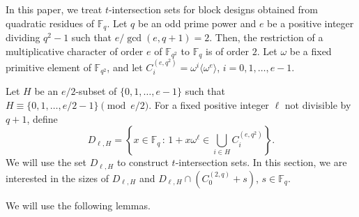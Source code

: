 \documentclass[ALCO,ThmDefs,Unicode]{cedram}
\newcommand*\F{{\mathbb F}}
\begin{document}
In this paper, we treat $t$-intersection sets for block designs obtained from quadratic residues of $\F_q$. Let $q$ be an odd prime power and $e$ be a positive integer dividing $q^2-1$ such that $e/\gcd{(e,q+1)}=2$. Then, the restriction of a multiplicative character of order $e$ of $\F_{q^2}$ to $\F_q$ is of order $2$. Let $\omega$ be a fixed primitive element of $\F_{q^2}$, and let $C_i^{(e,q^2)}=\omega^i\langle \omega^e\rangle$, $i=0,1,\ldots,e-1$.

Let $H$ be an $e/2$-subset of $\{0,1,\ldots,e-1\}$ such that $H\equiv \{0,1,\ldots,e/2-1\}\pmod{e/2}$. For a fixed positive integer $\ell$ not divisible by $q+1$, define
\begin{equation}\label{eq:defDDD}
D_{\ell,H}=\left\{x\in \F_q\,:\,1+x \omega^\ell\in \bigcup_{i \in H}C_i^{(e,q^2)}\right\}.
\end{equation}
We will use the set $D_{\ell,H}$ to construct $t$-intersection sets. In this section, we are interested in the sizes of $D_{\ell,H}$ and $D_{\ell,H}\cap (C_0^{(2,q)}+s)$, $s\in \F_q$.

We will use the following lemmas.
\end{document}
